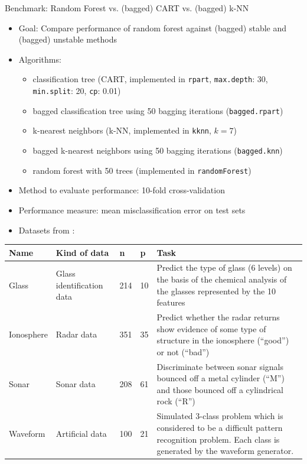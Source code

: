 \documentclass[11pt,compress,t,notes=noshow, xcolor=table]{beamer}
\let\code=\texttt
\begin{document}
\begin{vbframe}{Benchmark: Random Forest vs. (bagged) CART vs. (bagged) k-NN}

  \begin{itemize}
    \item Goal: Compare performance of random forest against (bagged) stable and (bagged) unstable methods
    \item Algorithms:
    \begin{itemize}
      \item classification tree (CART, implemented in \code{rpart}, \code{max.depth}: 30, \code{min.split}: 20, \code{cp}: 0.01)
      \item bagged classification tree using 50 bagging iterations (\code{bagged.rpart})
      \item k-nearest neighbors (k-NN, implemented in \code{kknn}, $k=7$)
      \item bagged k-nearest neighbors using 50 bagging iterations (\code{bagged.knn})
      \item random forest with 50 trees (implemented in \code{randomForest})
    \end{itemize}
    \item Method to evaluate performance: 10-fold cross-validation
    \item Performance measure: mean misclassification error on test sets
    \end{itemize}

    \framebreak

    \begin{itemize}
    \item Datasets from :
    \end{itemize}

\begin{table}
\footnotesize
\begin{tabular}{p{1.5cm}p{2cm}p{0.5cm}p{0.5cm}p{5cm}}
Name & Kind of data &  n & p & Task\\
\hline
Glass & Glass identification data & 214 & 10 & Predict the type of glass (6 levels) on the basis of the chemical analysis of the glasses represented by the 10 features\\
Ionosphere & Radar data & 351 & 35 & Predict whether the radar returns show evidence of some type of structure in the ionosphere (\enquote{good}) or not (\enquote{bad}) \\
Sonar & Sonar data & 208 & 61 & Discriminate between sonar signals bounced off a metal cylinder (\enquote{M}) and those bounced off a cylindrical rock (\enquote{R})\\
Waveform & Artificial data & 100 & 21 & Simulated 3-class problem which is considered to be a difficult pattern recognition problem. Each class is generated by the waveform generator.\\
\hline
\end{tabular}
\end{table}


\end{vbframe}
\end{document}
